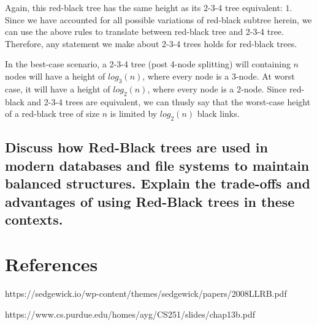 \documentclass[12pt]{amsart}
\begin{document}
    Again, this red-black tree has the same height as its 2-3-4
    tree equivalent: $1$. Since we have accounted for all
    possible variations of red-black subtree herein, we can use
    the above rules to translate between red-black tree and
    2-3-4 tree. Therefore, any statement we make about 2-3-4
    trees holds for red-black trees.

    In the best-case scenario, a 2-3-4 tree (post 4-node
    splitting) will containing $n$ nodes will have a height of
    $log_3(n)$, where every node is a 3-node. At worst case, it
    will have a height of $log_2(n)$, where every node is a
    2-node. Since red-black and 2-3-4 trees are equivalent, we
    can thusly say that the worst-case height of a red-black
    tree of size $n$ is limited by $log_2(n)$ black links.

    \newpage
    \subsection{Discuss how Red-Black trees are used in modern
    databases and file systems to maintain balanced structures.
    Explain the trade-offs and advantages of using Red-Black
    trees in these contexts.}

\section{References}

    https://sedgewick.io/wp-content/themes/sedgewick/papers/2008LLRB.pdf

    https://www.cs.purdue.edu/homes/ayg/CS251/slides/chap13b.pdf
\end{document}

